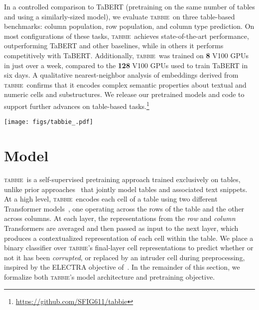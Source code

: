 \documentclass[11pt]{article}
\newcommand{\name}[0]{\textsc{tabbie}}
\begin{document}
In a controlled comparison to TaBERT (pretraining on the same number of tables and using a similarly-sized model), we evaluate \name\ on three table-based benchmarks: column population, row population, and column type prediction. On most configurations of these tasks, \name\ achieves state-of-the-art performance, outperforming TaBERT and other baselines, while in others it performs competitively with TaBERT. Additionally, \name\ was trained on \textbf{8} V100 GPUs in just over a week, compared to the \textbf{128} V100 GPUs used to train TaBERT in six days. A qualitative nearest-neighbor analysis of embeddings derived from \name\ confirms that it encodes complex semantic properties about textual and numeric cells and substructures. We release our pretrained models and code to support further advances on table-based tasks.\footnote{\url{https://github.com/SFIG611/tabbie}}







\makeatother
\begin{figure*}[t]
 \centering
  \texttt{[image: figs/tabbie\_.pdf]}
  \caption{\name's computations at one layer. For a given table, the row Transformer contextualizes the representations of the cells in each row, while the column Transformer similarly contextualizes cells in each column. The final cell representation is an average of the row and column embeddings, which is passed as input to the next layer. \textsc{[cls]} tokens are prepended to each row and column to facilitate downstream tasks operating on table substructures.}
  \label{fig:model}
\end{figure*}
 








%
 \section{Model}
\label{sec:model}

\name\ is a self-supervised pretraining approach trained exclusively on tables, unlike prior approaches~\citep{Herzig2020TAPASWS,yin20acl} that jointly model tables and associated text snippets. At a high level, \name\ encodes each cell of a table using two different Transformer models~\citep{NIPS2017_7181}, one operating across the rows of the table and the other across columns. At each layer, the representations from the \emph{row} and \emph{column} Transformers are averaged and then passed as input to the next layer, which produces a contextualized representation of each cell within the table. We place a binary classifier over \name's final-layer cell representations to predict whether or not it has been \emph{corrupted}, or replaced by an intruder cell during preprocessing, inspired by the ELECTRA objective of~\citet{Clark2020ELECTRA:}. In the remainder of this section, we formalize both \name's model architecture and pretraining objective.
\end{document}
